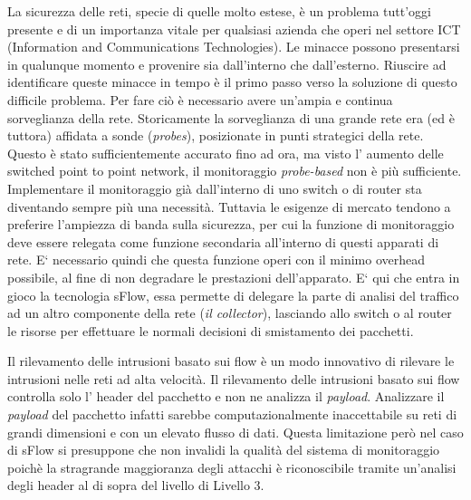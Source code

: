 \documentclass[12pt,a4paper,openright,twoside]{report}
\begin{document}
La sicurezza delle reti, specie di quelle molto estese, \`e un problema tutt'oggi
presente e di un importanza vitale per qualsiasi azienda che operi nel settore ICT (Information and Communications Technologies).
Le minacce possono presentarsi in qualunque momento \cite{K3} e provenire sia dall'interno
che dall'esterno. Riuscire ad identificare queste minacce in tempo \`e il primo passo verso la soluzione di
questo difficile problema. Per fare ci\`o \`e necessario avere un'ampia e continua
sorveglianza della rete.
Storicamente la sorveglianza di una grande rete era (ed \`e tuttora) affidata a sonde ({\it probes}),
posizionate in punti strategici della rete. Questo \`e stato sufficientemente accurato
fino ad ora, ma visto l' aumento delle switched point to point network, il monitoraggio {\it probe-based} non
\`e pi\`u sufficiente.
Implementare il monitoraggio gi\`a dall'interno di uno switch o di router sta
diventando sempre pi\`u una necessit\`a. Tuttavia le esigenze di mercato tendono a preferire
l'ampiezza di banda sulla sicurezza, per cui la funzione di monitoraggio deve essere relegata come
funzione secondaria all'interno di questi apparati di rete. E` necessario quindi che questa funzione
operi con il minimo overhead possibile, al fine di non degradare le prestazioni dell'apparato.
E` qui che entra in gioco la tecnologia sFlow, essa permette di delegare la parte di analisi del traffico
ad un altro componente della rete ({\it il collector}), lasciando allo switch o al router le risorse per
effettuare le normali decisioni di smistamento dei pacchetti.

Il rilevamento delle intrusioni basato sui flow \`e un modo innovativo di rilevare
le intrusioni nelle reti ad alta velocit\`a. Il rilevamento delle intrusioni basato
sui flow controlla solo l' header del pacchetto e non ne analizza il {\it payload}.
Analizzare il {\it payload} del pacchetto infatti sarebbe computazionalmente inaccettabile
su reti di grandi dimensioni e con un elevato flusso di dati. Questa limitazione per\`o
nel caso di sFlow si presuppone che non invalidi la qualit\`a del sistema di monitoraggio
poich\`e la stragrande maggioranza degli attacchi \`e riconoscibile tramite un'analisi
degli header al di sopra del livello di Livello 3.
\end{document}
